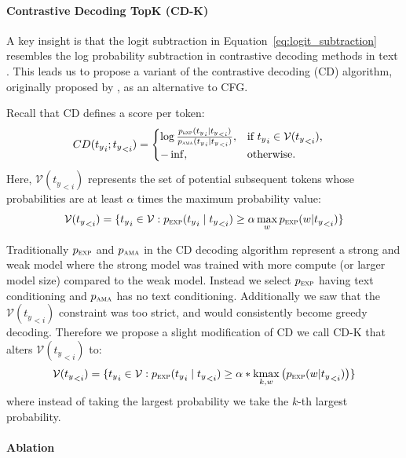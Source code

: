 \documentclass{article}
\newcommand{\exper}[1]{\textsc{#1}}
\newcommand{\pexpert}{p_\exper{exp}}
\newcommand{\pamateur}{p_\exper{ama}}
\newcommand{\kmax}[2]{\underset{#2}{\mathrm{kmax}}\left(#1\right)}
\begin{document}
\paragraph{Contrastive Decoding TopK (CD-K)}
A key insight is that the logit subtraction in Equation~\ref{eq:logit_subtraction} resembles the log probability subtraction in contrastive decoding methods in text \citep{contrastive_decoding}. This leads us to propose a variant of the contrastive decoding (CD) algorithm, originally proposed by \citet{contrastive_decoding}, as an alternative to CFG.

Recall that CD defines a score per token:
\begin{align*}
& CD({t_y}_i; {t_y}_{<i})
= \begin{cases}
\log \frac{\pexpert ( {t_y}_i \mid {t_y}_{<i})}{ \pamateur( {t_y}_i \mid {t_y}_{<i})},
& \text{if } {t_y}_i \in \mathcal{V}({t_y}_{<i}) \text{,}\\
-\inf,    	      & \text{otherwise.} 
\end{cases}  \nonumber 
\end{align*}
Here, $\mathcal{V}({t_y}_{<i})$ represents the set of potential subsequent tokens whose probabilities are at least $\alpha$ times the maximum probability value:
\begin{align*}
\mathcal{V}({t_y}_{<i}) = \{{t_y}_i \in \mathcal{V}: \pexpert({t_y}_i \mid {t_y}_{<i}) \geq \alpha \max_w \pexpert(w | {t_y}_{<i}) \}
\end{align*}

Traditionally $\pexpert$ and $\pamateur$ in the CD decoding algorithm represent a strong and weak model where the strong model was trained with more compute (or larger model size) compared to the weak model. Instead we select $\pexpert$ having text conditioning and $\pamateur$ has no text conditioning. Additionally we saw that the $\mathcal{V}({t_y}_{<i})$ constraint was too strict, and would consistently become greedy decoding. Therefore we propose a slight modification of CD we call CD-K that alters $\mathcal{V}({t_y}_{<i})$ to:
\begin{equation}
    \mathcal{V}({t_y}_{<i}) = \{{t_y}_i \in \mathcal{V}: \pexpert({t_y}_i \mid {t_y}_{<i}) \geq \alpha *\kmax{\pexpert(w | {t_y}_{<i})}{k, w} \}
\end{equation}
where instead of taking the largest probability we take the $k$-th largest probability.

\paragraph{Ablation}
\end{document}
